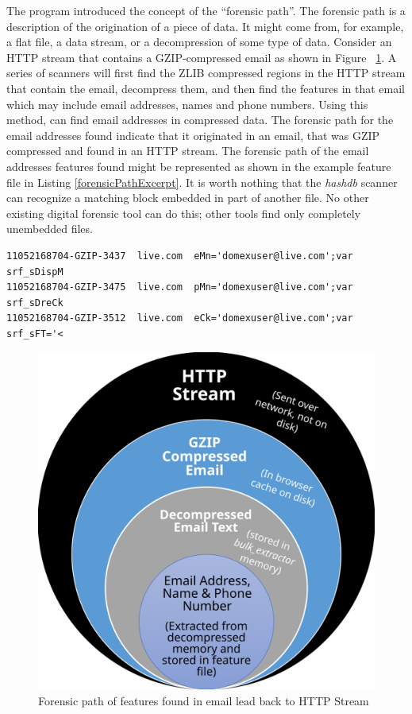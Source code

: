 \documentclass[11pt,fleqn]{article} %
\begin{document}
The \bulk program introduced the concept of the ``forensic path''. The forensic path is a description of the origination of a piece of data. It might come from, for example, a flat file, a data stream, or a decompression of some type of data. Consider an HTTP stream that contains a GZIP-compressed email as shown in Figure ~\ref{fig:forensicPath}. A series of \bulk scanners will first find the ZLIB compressed regions in the HTTP stream that contain the email, decompress them, and then find the features in that email which may include email addresses, names and phone numbers. Using this method, \bulk can find email addresses in compressed data. The forensic path for the email addresses found indicate that it originated in an email, that was GZIP compressed and found in an HTTP stream. The forensic path of the email addresses features found might be represented as shown in the example feature file in Listing \ref{forensicPathExcerpt}. It is worth nothing that the \textit{hashdb} scanner can recognize a matching block embedded in part of another file. No other existing digital forensic tool can do this; other tools find only completely unembedded files.\\
\lstset{style=customfile}
\begin{lstlisting}[float, caption=Forensic Path of email address features found in \bulk, label=forensicPathExcerpt]
11052168704-GZIP-3437  live.com  eMn='domexuser@live.com';var  srf_sDispM
11052168704-GZIP-3475  live.com  pMn='domexuser@live.com';var  srf_sDreCk
11052168704-GZIP-3512  live.com  eCk='domexuser@live.com';var  srf_sFT='<
\end{lstlisting}


\begin{figure}
	\center
	\includegraphics[scale=.55]{drawings/forensic_path}
	\caption{Forensic path of features found in email lead back to HTTP Stream}
	\label{fig:forensicPath}
\end{figure}
\end{document}
